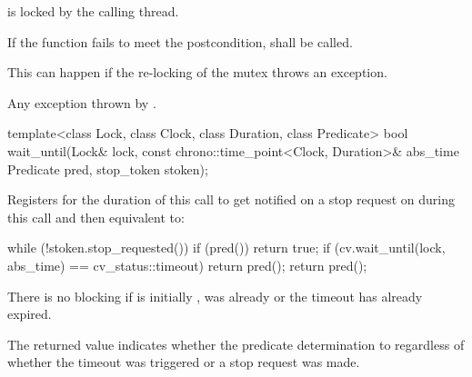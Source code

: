 {\begin{itemdescr}
 \pnum \postconditions {} is locked by the calling thread.

 \pnum \remarks
        If the function fails to meet the postcondition, 
        shall be called.
        \begin{note} This can happen if the re-locking of the mutex throws an exception. \end{note}

 \pnum \throws 
        Any exception thrown by .


\end{itemdescr}




\begin{itemdecl}
template<class Lock, class Clock, class Duration, class Predicate>
  bool wait_until(Lock& lock,
                  const chrono::time_point<Clock, Duration>& abs_time
                  Predicate pred,
                  stop_token stoken);
\end{itemdecl}

\begin{itemdescr}
 \pnum\effects Registers for the duration of this call  to get notified on a stop request on 
                during this call and then equivalent to:
\begin{codeblock}
while (!stoken.stop_requested()) {
  if (pred())
    return true;
  if (cv.wait_until(lock, abs_time) == cv_status::timeout)
    return pred();
}
return pred();
\end{codeblock}

\pnum
\begin{note} There is no blocking if
              is initially , 
              was already  or
             the timeout has already expired. \end{note}

\pnum
\begin{note} The returned value indicates whether the predicate determination to 
regardless of whether the timeout was triggered or a stop request was made. \end{note}


\end{itemdescr}}
